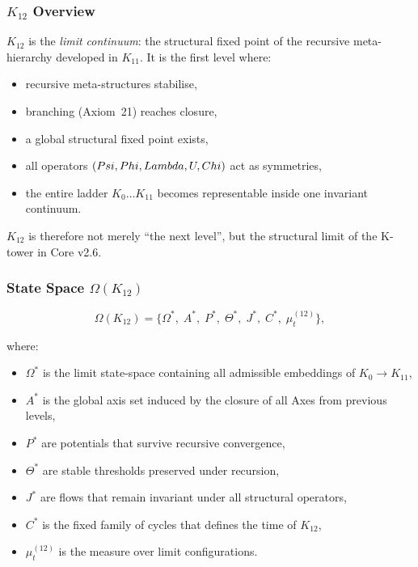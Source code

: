 

\subsubsection{$K_{12}$ Overview}
\label{sec:k12-overview}

$K_{12}$ is the \emph{limit continuum}: the structural fixed point of the
recursive meta-hierarchy developed in $K_{11}$.  
It is the first level where:

\begin{itemize}
    \item recursive meta-structures stabilise,
    \item branching (Axiom~21) reaches closure,
    \item a global structural fixed point exists,
    \item all operators $(Psi,Phi,Lambda,U,Chi)$ act as symmetries,
    \item the entire ladder $K_0\dots K_{11}$ becomes representable inside one
          invariant continuum.
\end{itemize}

$K_{12}$ is therefore not merely “the next level”, but the structural limit of
the K-tower in Core v2.6.

\subsubsection{State Space $\Omega(K_{12})$}

\[
\Omega(K_{12}) =
\{
\Omega^*,\;
A^*,\;
P^*,\;
\Theta^*,\;
J^*,\;
C^*,\;
\mu^{(12)}_t
\},
\]

where:
\begin{itemize}
    \item $\Omega^*$ is the limit state-space containing all admissible embeddings
          of $K_0\!\to\!K_{11}$,
    \item $A^*$ is the global axis set induced by the closure of all Axes
          from previous levels,
    \item $P^*$ are potentials that survive recursive convergence,
    \item $\Theta^*$ are stable thresholds preserved under recursion,
    \item $J^*$ are flows that remain invariant under all structural operators,
    \item $C^*$ is the fixed family of cycles that defines the time of $K_{12}$,
    \item $\mu^{(12)}_t$ is the measure over limit configurations.
\end{itemize}

